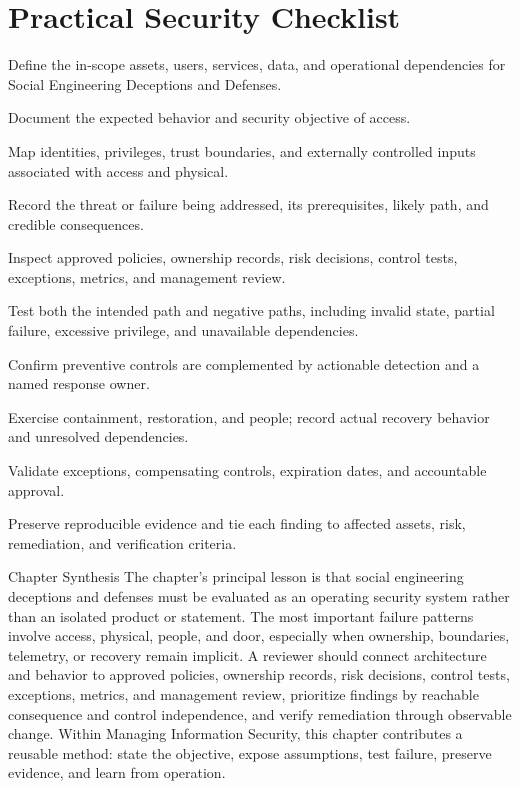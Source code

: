 \documentclass[11pt,letterpaper]{article}
\begin{document}
\section*{Practical Security Checklist}
\begin{CornellChecklist}
\item Define the in-scope assets, users, services, data, and operational dependencies for Social Engineering Deceptions and Defenses.
\item Document the expected behavior and security objective of access.
\item Map identities, privileges, trust boundaries, and externally controlled inputs associated with access and physical.
\item Record the threat or failure being addressed, its prerequisites, likely path, and credible consequences.
\item Inspect approved policies, ownership records, risk decisions, control tests, exceptions, metrics, and management review.
\item Test both the intended path and negative paths, including invalid state, partial failure, excessive privilege, and unavailable dependencies.
\item Confirm preventive controls are complemented by actionable detection and a named response owner.
\item Exercise containment, restoration, and people; record actual recovery behavior and unresolved dependencies.
\item Validate exceptions, compensating controls, expiration dates, and accountable approval.
\item Preserve reproducible evidence and tie each finding to affected assets, risk, remediation, and verification criteria.
\end{CornellChecklist}
\begin{CornellSummaryBox}{Chapter Synthesis}
The chapter's principal lesson is that social engineering deceptions and defenses must be evaluated as an operating security system rather than an isolated product or statement. The most important failure patterns involve access, physical, people, and door, especially when ownership, boundaries, telemetry, or recovery remain implicit. A reviewer should connect architecture and behavior to approved policies, ownership records, risk decisions, control tests, exceptions, metrics, and management review, prioritize findings by reachable consequence and control independence, and verify remediation through observable change. Within Managing Information Security, this chapter contributes a reusable method: state the objective, expose assumptions, test failure, preserve evidence, and learn from operation.
\end{CornellSummaryBox}
\end{document}
